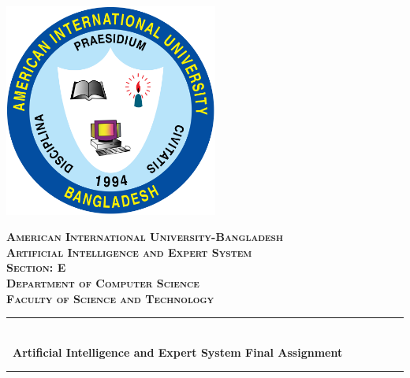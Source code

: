 \begin{titlepage}

\newcommand{\HRule}{\rule{\linewidth}{0.5mm}} %

\center
\includegraphics[width=7cm]{Title/AIUB_Monogram.png}\\[1cm] %
 

\center %


\textsc{\LARGE \textbf{American International University-Bangladesh}}\\[1.5cm] %
\textsc{\Large \textbf{Artificial Intelligence and Expert System}}\\[0.5cm] %
\textsc{\large \textbf{Section: E}}\\[0.5cm] %
\textsc{\large  \textbf{Department of Computer Science}}\\[0.5cm] %
\textsc{\large  \textbf{Faculty of Science and Technology}}\\[0.5cm] %

\makeatletter
\HRule \\[0.4cm]
{ \huge \bfseries \ Artificial Intelligence and Expert System Final Assignment}\\[0.4cm] %
\HRule \\[1.5cm]
 

\end{titlepage}
